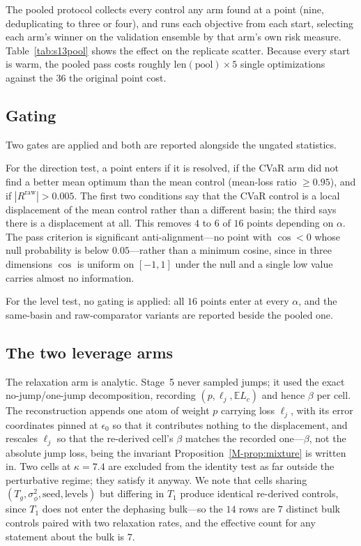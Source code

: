 \documentclass[aps,pra,onecolumn,notitlepage,superscriptaddress,nofootinbib,floatfix]{revtex4-2}
\newcommand{\E}{\mathbb{E}}
\begin{document}
The pooled protocol collects every control any arm found at a point
(nine, deduplicating to three or four), and runs each objective from each
start, selecting each arm's winner on the validation ensemble by that arm's
own risk measure. Table~\ref{tab:s13pool} shows the effect on the replicate
scatter. Because every start is warm, the pooled pass costs roughly
$\mathrm{len(pool)}\times5$ single optimizations against the $36$ the
original point cost.

\subsection{Gating}

Two gates are applied and both are reported alongside the ungated statistics.

For the direction test, a point enters if it is resolved, if the CVaR arm did
not find a better mean optimum than the mean control (mean-loss ratio
$\ge0.95$), and if $|R^{\mathrm{raw}}|>0.005$. The first two conditions say
that the CVaR control is a local displacement of the mean control rather than
a different basin; the third says there is a displacement at all. This
removes $4$ to $6$ of $16$ points depending on $\alpha$. The pass criterion
is significant anti-alignment---no point with $\cos<0$ whose null probability
is below $0.05$---rather than a minimum cosine, since in three dimensions
$\cos$ is uniform on $[-1,1]$ under the null and a single low value carries
almost no information.

For the level test, no gating is applied: all $16$ points enter at every
$\alpha$, and the same-basin and raw-comparator variants are reported beside
the pooled one.

\subsection{The two leverage arms}

The relaxation arm is analytic. Stage~5 never sampled jumps; it used the
exact no-jump/one-jump decomposition, recording $(p,\ell_j,\E L_c)$ and hence
$\beta$ per cell. The reconstruction appends one atom of weight $p$ carrying
loss $\ell_j$, with its error coordinates pinned at $\epsilon_0$ so that it
contributes nothing to the displacement, and rescales $\ell_j$ so that the
re-derived cell's $\beta$ matches the recorded one---$\beta$, not the
absolute jump loss, being the invariant Proposition~\ref{M-prop:mixture} is
written in. Two cells at $\kappa=7.4$ are excluded from the identity test as
far outside the perturbative regime; they satisfy it anyway. We note that
cells sharing $(T_g,\sigma_\phi^2,\text{seed},\text{levels})$ but differing
in $T_1$ produce identical re-derived controls, since $T_1$ does not enter
the dephasing bulk---so the $14$ rows are $7$ distinct bulk controls paired
with two relaxation rates, and the effective count for any statement about
the bulk is $7$.
\end{document}
